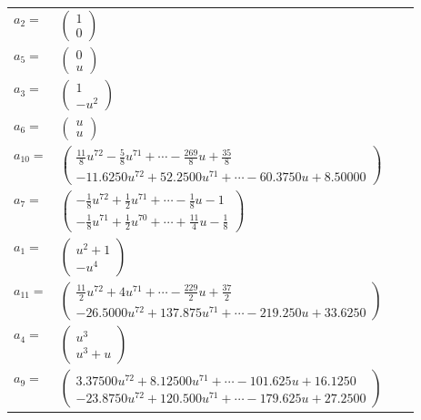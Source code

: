 \documentclass[1p]{elsarticle_modified}
\theoremstyle{definition}
\begin{document}
\begin{tabular}{m{7pt} m{180pt} m{7pt} m{180pt} }
\flushright $a_{2}=$&$\begin{pmatrix}1\\0\end{pmatrix}$ \\
\flushright $a_{5}=$&$\begin{pmatrix}0\\u\end{pmatrix}$ \\
\flushright $a_{3}=$&$\begin{pmatrix}1\\- u^2\end{pmatrix}$ \\
\flushright $a_{6}=$&$\begin{pmatrix}u\\u\end{pmatrix}$ \\
\flushright $a_{10}=$&$\begin{pmatrix}\frac{11}{8} u^{72}-\frac{5}{8} u^{71}+\cdots-\frac{269}{8} u+\frac{35}{8}\\-11.6250 u^{72}+52.2500 u^{71}+\cdots-60.3750 u+8.50000\end{pmatrix}$ \\
\flushright $a_{7}=$&$\begin{pmatrix}-\frac{1}{8} u^{72}+\frac{1}{2} u^{71}+\cdots-\frac{1}{8} u-1\\-\frac{1}{8} u^{71}+\frac{1}{2} u^{70}+\cdots+\frac{11}{4} u-\frac{1}{8}\end{pmatrix}$ \\
\flushright $a_{1}=$&$\begin{pmatrix}u^2+1\\- u^4\end{pmatrix}$ \\
\flushright $a_{11}=$&$\begin{pmatrix}\frac{11}{2} u^{72}+4 u^{71}+\cdots-\frac{229}{2} u+\frac{37}{2}\\-26.5000 u^{72}+137.875 u^{71}+\cdots-219.250 u+33.6250\end{pmatrix}$ \\
\flushright $a_{4}=$&$\begin{pmatrix}u^3\\u^3+u\end{pmatrix}$ \\
\flushright $a_{9}=$&$\begin{pmatrix}3.37500 u^{72}+8.12500 u^{71}+\cdots-101.625 u+16.1250\\-23.8750 u^{72}+120.500 u^{71}+\cdots-179.625 u+27.2500\end{pmatrix}$ \\

\end{tabular}
\end{document}
